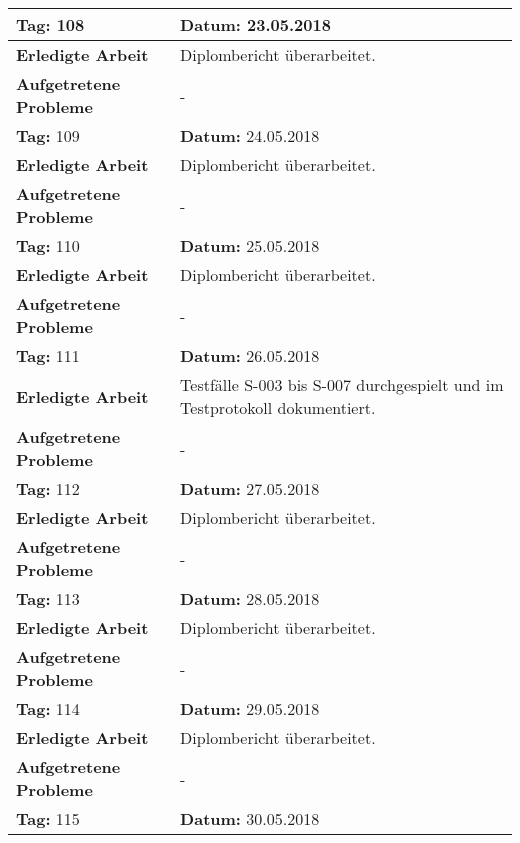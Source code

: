 \begin{longtable}{|p{5cm}|p{5cm}p{6cm}|}
\rowcolor{heading}\textbf{Tag:} 108 & \textbf{Datum:} 23.05.2018 & \\ \hline
\textbf{Erledigte Arbeit} & \multicolumn{2}{p{11cm}|}{Diplombericht überarbeitet.} \\ \hline
\textbf{Aufgetretene Probleme} & \multicolumn{2}{p{11cm}|}{-} \\ \hline
\rowcolor{heading}\textbf{Tag:} 109 & \textbf{Datum:} 24.05.2018 & \\ \hline
\textbf{Erledigte Arbeit} & \multicolumn{2}{p{11cm}|}{Diplombericht überarbeitet.} \\ \hline
\textbf{Aufgetretene Probleme} & \multicolumn{2}{p{11cm}|}{-} \\ \hline
\rowcolor{heading}\textbf{Tag:} 110 & \textbf{Datum:} 25.05.2018 & \\ \hline
\textbf{Erledigte Arbeit} & \multicolumn{2}{p{11cm}|}{Diplombericht überarbeitet.} \\ \hline
\textbf{Aufgetretene Probleme} & \multicolumn{2}{p{11cm}|}{-} \\ \hline
\rowcolor{heading}\textbf{Tag:} 111 & \textbf{Datum:} 26.05.2018 & \\ \hline
\textbf{Erledigte Arbeit} & \multicolumn{2}{p{11cm}|}{Testfälle S-003 bis S-007 durchgespielt und im Testprotokoll dokumentiert.} \\ \hline
\textbf{Aufgetretene Probleme} & \multicolumn{2}{p{11cm}|}{-} \\ \hline
\rowcolor{heading}\textbf{Tag:} 112 & \textbf{Datum:} 27.05.2018 & \\ \hline
\textbf{Erledigte Arbeit} & \multicolumn{2}{p{11cm}|}{Diplombericht überarbeitet.} \\ \hline
\textbf{Aufgetretene Probleme} & \multicolumn{2}{p{11cm}|}{-} \\ \hline
\rowcolor{heading}\textbf{Tag:} 113 & \textbf{Datum:} 28.05.2018 & \\ \hline
\textbf{Erledigte Arbeit} & \multicolumn{2}{p{11cm}|}{Diplombericht überarbeitet.} \\ \hline
\textbf{Aufgetretene Probleme} & \multicolumn{2}{p{11cm}|}{-} \\ \hline
\rowcolor{heading}\textbf{Tag:} 114 & \textbf{Datum:} 29.05.2018 & \\ \hline
\textbf{Erledigte Arbeit} & \multicolumn{2}{p{11cm}|}{Diplombericht überarbeitet.} \\ \hline
\textbf{Aufgetretene Probleme} & \multicolumn{2}{p{11cm}|}{-} \\ \hline
\rowcolor{heading}\textbf{Tag:} 115 & \textbf{Datum:} 30.05.2018 & \\ \hline

\end{longtable}
